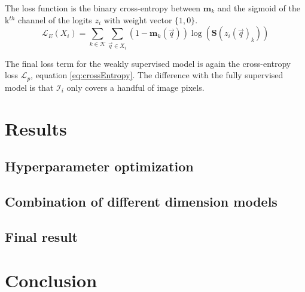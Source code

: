 \begin{multicols}{2}
{    The loss function is the binary cross-entropy between $\mathbf{m}_k$ and the sigmoid of the k$^{th}$ channel of the logits $z_i$ with weight vector $\{1, 0\}$.
}
\begin{equation}
    \mathcal{L}_E(X_i) = \sum_{k\in\mathcal{K}}\sum_{\vec{q}\in X_i}  (1-\mathbf{m}_k(\vec{q})) \log(\mathbf{S}(z_i(\vec{q})_k)) 
\end{equation}
\par{
    The final loss term for the weakly supervised model is again the cross-entropy loss $\mathcal{L}_p$, equation \ref{eq:crossEntropy}. 
    The difference with the fully supervised model is that $\mathcal{I}_i$ only covers a handful of image pixels.
}
\thispagestyle{plain}
\section*{Results}
\subsection*{Hyperparameter optimization}

\subsection*{Combination of different dimension models}

\subsection*{Final result}

\section*{Conclusion}
\cleardoublepage
\end{multicols}